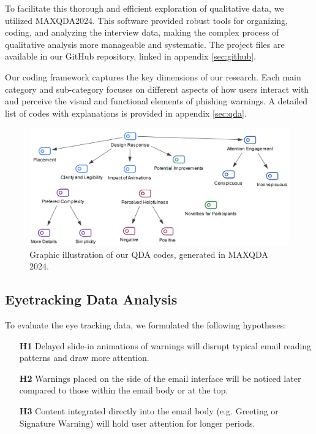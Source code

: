 \documentclass[
  a4paper,  %
  twoside,  %
  bibliography=totoc,
  headsepline,
  cleardoublepage=empty,
  parskip=half,
  draft=false
]{scrbook}
\begin{document}
To facilitate this thorough and efficient exploration of qualitative data, we utilized MAXQDA2024. This software provided robust tools for organizing, coding, and analyzing the interview data, making the complex process of qualitative analysis more manageable and systematic. The project files are available in our GitHub repository, linked in appendix \ref{sec:github}.

Our coding framework captures the key dimensions of our research. Each main category and sub-category focuses on different aspects of how users interact with and perceive the visual and functional elements of phishing warnings. A detailed list of codes with explanations is provided in appendix \ref{sec:qda}. 

\begin{figure} [ht]
    \centering
    \includegraphics[width=0.9\linewidth]{figures/coding.png}
    \caption{Graphic illustration of our QDA codes, generated in MAXQDA 2024.}
    \label{fig:qda}
\end{figure}

\subsection{Eyetracking Data Analysis}
To evaluate the eye tracking data, we formulated the following hypotheses:

\begin{itemize}
    \item[\textbf{H1}] Delayed slide-in animations of warnings will disrupt typical email reading patterns and draw more attention.
    \item[\textbf{H2}] Warnings placed on the side of the email interface will be noticed later compared to those within the email body or at the top.
    \item[\textbf{H3}] Content integrated directly into the email body (e.g. Greeting or Signature Warning) will hold user attention for longer periods.
\end{itemize}
\end{document}
